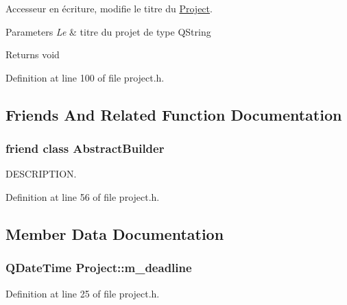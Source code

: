 Accesseur en écriture, modifie le titre du \hyperlink{class_project}{Project}. 


\begin{DoxyParams}{Parameters}
{\em Le} & titre du projet de type Q\+String \\
\hline
\end{DoxyParams}
\begin{DoxyReturn}{Returns}
void 
\end{DoxyReturn}


Definition at line 100 of file project.\+h.



\subsection{Friends And Related Function Documentation}
\hypertarget{class_project_a06c624af20d5eed8215dc1c10dce88ab}{}
\subsubsection[{Abstract\+Builder}]{\setlength{\rightskip}{0pt plus 5cm}friend class {\bf Abstract\+Builder}\hspace{0.3cm}{\ttfamily [friend]}}\label{class_project_a06c624af20d5eed8215dc1c10dce88ab}


D\+E\+S\+C\+R\+I\+P\+T\+I\+O\+N. 



Definition at line 56 of file project.\+h.



\subsection{Member Data Documentation}
\hypertarget{class_project_a0a6958e225544a4df8e9a772c44fcab9}{}
\subsubsection[{m\+\_\+deadline}]{\setlength{\rightskip}{0pt plus 5cm}Q\+Date\+Time Project\+::m\+\_\+deadline\hspace{0.3cm}{\ttfamily [protected]}}\label{class_project_a0a6958e225544a4df8e9a772c44fcab9}


Definition at line 25 of file project.\+h.

